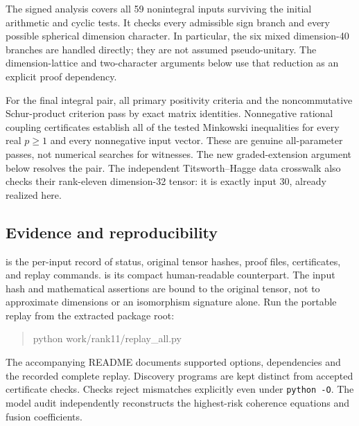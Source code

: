 \documentclass[11pt,a4paper]{article}
\begin{document}
The signed analysis covers all 59 nonintegral inputs surviving the initial
arithmetic and cyclic tests. It checks every admissible sign branch and every
possible spherical dimension character. In particular, the six mixed
dimension-40 branches are handled directly; they are not assumed
pseudo-unitary. The dimension-lattice and two-character arguments below use
that reduction as an explicit proof dependency.

For the final integral pair, all primary positivity criteria and the
noncommutative Schur-product criterion pass by exact matrix identities.
Nonnegative rational coupling certificates establish all of the tested
Minkowski inequalities for every real $p\geq1$ and every nonnegative input
vector. These are genuine all-parameter passes, not numerical searches for
witnesses. The new graded-extension argument below resolves the pair.
The independent Titsworth--Hagge data crosswalk also checks their rank-eleven
dimension-32 tensor: it is exactly input 30, already realized here.

\subsection{Evidence and reproducibility}
 is the per-input record of status, original
tensor hashes, proof files, certificates, and replay commands.
 is its compact human-readable counterpart.
The input hash and mathematical assertions are bound to the original tensor,
not to approximate dimensions or an isomorphism signature alone.
Run the portable replay from the extracted package root:
\begin{quote}\ttfamily
python work/rank11/replay\_all.py
\end{quote}
The accompanying README documents supported options, dependencies and the
recorded complete replay. Discovery programs are kept distinct from accepted
certificate checks. Checks reject mismatches explicitly even under
\texttt{python -O}. The model audit independently reconstructs the highest-risk
coherence equations and fusion coefficients.
\end{document}
